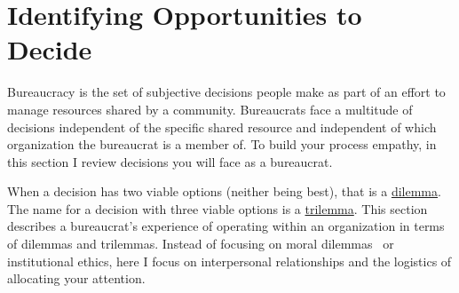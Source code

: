 \section{Identifying Opportunities to Decide\label{sec:dilemma-trilemma}}



Bureaucracy is the set of subjective decisions people make as part of an effort to manage resources shared by a community. 
Bureaucrats face a multitude of decisions independent of the specific shared resource and independent of which organization the bureaucrat is a member of. To build your process empathy, in this section I review decisions you will face as a bureaucrat.

When a decision has two viable options (neither being best), that is a \href{https://en.wikipedia.org/wiki/Dilemma}{dilemma}. 
\iftoggle{WPinmargin}{\marginpar{$>$Wikipedia: dilemma}}{}
The name for a decision with three viable options is a \href{https://en.wikipedia.org/wiki/Trilemma}{trilemma}. 
This section describes a bureaucrat's experience of operating within an organization in terms of dilemmas and trilemmas. Instead of focusing on moral dilemmas~\cite{2017_Zacka} or institutional ethics, here I focus on interpersonal relationships and the logistics of allocating your attention. 

